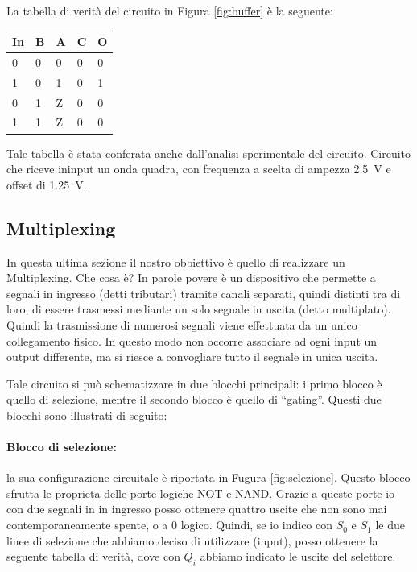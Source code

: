 La tabella di verità del circuito in Figura \ref{fig:buffer} è la seguente:

\begin{center}
	\begin{tabular}{lllll}
	\toprule
		In & B & A & C & O\\
	\midrule
		0 & 0 & 0 & 0 & 0 \\
		1 & 0 & 1 & 0 & 1 \\
		0 & 1 & Z & 0 & 0 \\
		1 & 1 & Z & 0 & 0 \\
	\bottomrule
	\end{tabular}
\end{center}
%
Tale tabella è stata conferata anche dall'analisi sperimentale del circuito. Circuito che riceve ininput un onda quadra, con frequenza a scelta di ampezza \SI{2.5}{\volt} e offset di \SI{1.25}{\volt}. 

\subsection*{Multiplexing}

In questa ultima sezione il nostro obbiettivo è quello di realizzare un Multiplexing. Che cosa è? In parole povere è un dispositivo che permette a segnali in ingresso (detti tributari) tramite canali separati, quindi distinti tra di loro, di essere trasmessi mediante un solo segnale in uscita (detto multiplato). Quindi la trasmissione di numerosi segnali viene effettuata da un unico collegamento fisico. In questo modo non occorre associare ad ogni input un output differente, ma si riesce a convogliare tutto il segnale in unica uscita.

Tale circuito si può schematizzare in due blocchi principali: i primo blocco è quello di selezione, mentre il secondo blocco è quello di ``gating''. 
Questi due blocchi sono illustrati di seguito:

\paragraph*{Blocco di selezione:}
la sua configurazione circuitale è riportata in Fugura \ref{fig:selezione}. Questo blocco sfrutta le proprieta delle porte logiche NOT e NAND. Grazie a queste porte io con due segnali in in ingresso posso ottenere quattro uscite che non sono mai contemporaneamente spente, o a 0 logico. Quindi, se io indico con $S_0$ e $S_1$ le due linee di selezione che abbiamo deciso di utilizzare (input), posso ottenere la seguente tabella di verità, dove con $Q_i$ abbiamo indicato le uscite del selettore.


